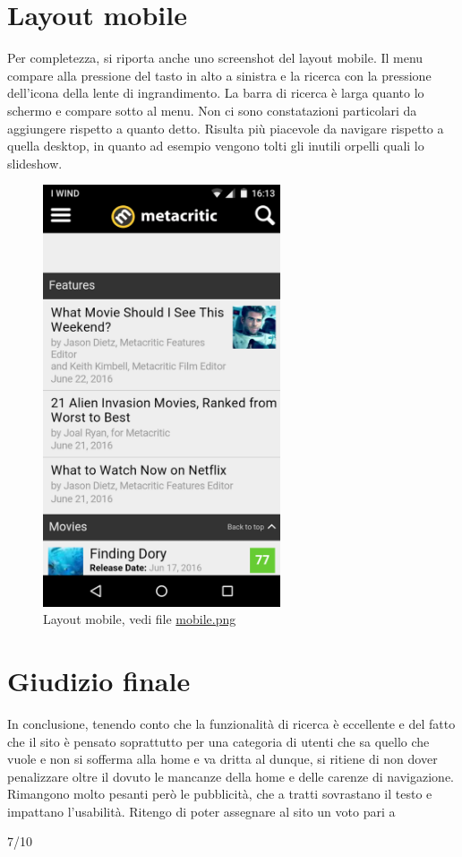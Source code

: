 \documentclass[12pt]{article}
\begin{document}
\section{Layout mobile}
Per completezza, si riporta anche uno screenshot del layout mobile. Il menu compare alla pressione del tasto in alto a sinistra e la ricerca con la pressione dell'icona della lente di ingrandimento.
La barra di ricerca è larga quanto lo schermo e compare sotto al menu. Non ci sono constatazioni particolari da aggiungere rispetto a quanto detto. Risulta più piacevole da navigare rispetto a quella desktop, in quanto ad esempio vengono tolti gli inutili orpelli quali lo slideshow.
\begin{figure}[H]
	\begin{center}
		\includegraphics[width=7cm]{mobile.png}
		\caption{Layout mobile, vedi file \href{mobile.png}{mobile.png}}
	\end{center}
\end{figure}
\section{Giudizio finale}
In conclusione, tenendo conto che la funzionalità di ricerca è eccellente e del fatto che il sito è pensato soprattutto per una categoria di utenti che sa quello che vuole e non si sofferma alla home e va dritta al dunque, si ritiene di non dover penalizzare oltre il dovuto le mancanze della home e delle carenze di navigazione. Rimangono molto pesanti però le pubblicità, che a tratti sovrastano il testo e impattano l'usabilità. Ritengo di poter assegnare al sito un voto pari a
	\begin{center}
		\huge 7/10
	\end{center}
	\newpage
\end{document}

